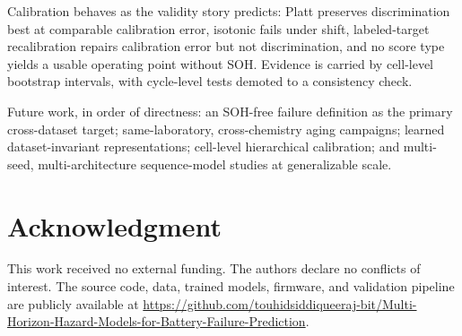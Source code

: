 \documentclass[preprint,12pt]{elsarticle}
\begin{document}
Calibration behaves as the validity story predicts: Platt preserves discrimination best at comparable calibration error, isotonic fails under shift, labeled-target recalibration repairs calibration error but not discrimination, and no score type yields a usable operating point without SOH. Evidence is carried by cell-level bootstrap intervals, with cycle-level tests demoted to a consistency check.

Future work, in order of directness: an SOH-free failure definition as the primary cross-dataset target; same-laboratory, cross-chemistry aging campaigns; learned dataset-invariant representations; cell-level hierarchical calibration; and multi-seed, multi-architecture sequence-model studies at generalizable scale.

\clearpage
\section*{Acknowledgment}
This work received no external funding. The authors declare no conflicts of interest. The source code, data, trained models, firmware, and validation pipeline are publicly available at \url{https://github.com/touhidsiddiqueeraj-bit/Multi-Horizon-Hazard-Models-for-Battery-Failure-Prediction}.
\end{document}
